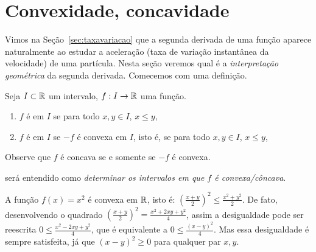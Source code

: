 % 


\section{Convexidade, concavidade}\label{Sec:Segundaderivada}

Vimos na Seção~\ref{sec:taxavariacao} que a segunda derivada de uma
função aparece naturalmente ao estudar a aceleração (taxa de variação
instantânea da
velocidade) de uma partícula. Nesta seção veremos qual é a
\emph{interpretação geométrica} da segunda derivada.  Comecemos com
uma definição.

\begin{defin} Seja $I\subset \mathbb{R}$ um intervalo, $f:I\to \mathbb{R}$ uma função.
\begin{enumerate}
\item $f$ é  em $I$ se para todo $x,y\in I$, $x\leq
y$,
\item 
{}
$f$ é  em $I$ se $-f$ é convexa em $I$, isto é,
se para todo $x,y\in I$, $x\leq y$,
\end{enumerate}
\end{defin}

\begin{obs}\label{obs:convconc}
Observe que $f$ é concava se e somente se $-f$ é convexa.
\end{obs}

 será entendido como
\emph{determinar os intervalos em que $f$ é convexa/côncava}.

\begin{ex}\label{ex:xoisconvexa}
A função $f(x)=x^2$ é convexa em $\mathbb{R}$, isto é:
$(\frac{x+y}{2})^2\leq \frac{x^2+y^2}{2}$.  
De fato, desenvolvendo o quadrado 
$(\frac{x+y}{2})^2=\frac{x^2+2xy+y^2}{4}$, assim a desigualdade
pode ser reescrita 
$0\leq \frac{x^2-2xy+y^2}{4}$, que é equivalente a $0\leq  \frac{(x-y)^2}{4}$. 
Mas essa desigualdade é sempre satisfeita, já que $(x-y)^2\geq 0$ para qualquer
par $x,y$.
\end{ex}

